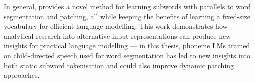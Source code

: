 In general, \tokname provides a novel method for learning subwords with parallels to word segmentation and patching, all while keeping the benefits of learning a fixed-size vocabulary for efficient language modelling. This work demonstrates how analytical research into alternative input representations can produce new insights for practical language modelling --- in this thesis, phoneme LMs trained on child-directed speech used for word segmentation has led to new insights into both static subword tokenisation and could also improve dynamic patching approaches. 







